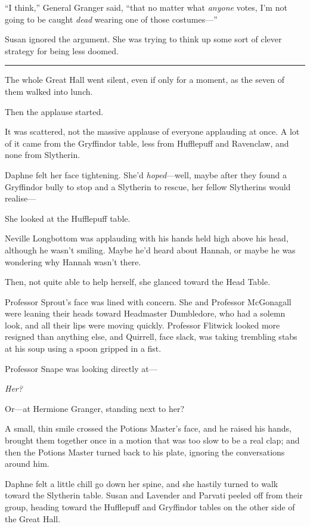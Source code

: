 ``I think,'' General Granger said, ``that no matter what \emph{anyone}
votes, I'm not going to be caught \emph{dead} wearing one of those
costumes---''

Susan ignored the argument. She was trying to think up some sort of
clever strategy for being less doomed.

\begin{center}\rule{3in}{0.4pt}\end{center}

The whole Great Hall went silent, even if only for a moment, as the
seven of them walked into lunch.

Then the applause started.

It was scattered, not the massive applause of everyone applauding at
once. A lot of it came from the Gryffindor table, less from Hufflepuff
and Ravenclaw, and none from Slytherin.

Daphne felt her face tightening. She'd \emph{hoped}---well, maybe after
they found a Gryffindor bully to stop and a Slytherin to rescue, her
fellow Slytherins would realise---

She looked at the Hufflepuff table.

Neville Longbottom was applauding with his hands held high above his
head, although he wasn't smiling. Maybe he'd heard about Hannah, or
maybe he was wondering why Hannah wasn't there.

Then, not quite able to help herself, she glanced toward the Head Table.

Professor Sprout's face was lined with concern. She and Professor
McGonagall were leaning their heads toward Headmaster Dumbledore, who
had a solemn look, and all their lips were moving quickly. Professor
Flitwick looked more resigned than anything else, and Quirrell, face
slack, was taking trembling stabs at his soup using a spoon gripped in a
fist.

Professor Snape was looking directly at---

\emph{Her?}

Or---at Hermione Granger, standing next to her?

A small, thin smile crossed the Potions Master's face, and he raised his
hands, brought them together once in a motion that was too slow to be a
real clap; and then the Potions Master turned back to his plate,
ignoring the conversations around him.

Daphne felt a little chill go down her spine, and she hastily turned to
walk toward the Slytherin table. Susan and Lavender and Parvati peeled
off from their group, heading toward the Hufflepuff and Gryffindor
tables on the other side of the Great Hall.

